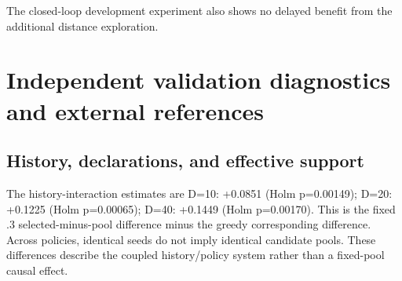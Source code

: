 \documentclass[suppldata]{interact}
\begin{document}
\endgroup

The closed-loop development experiment also shows no delayed benefit from the additional distance exploration.

\hypertarget{independent-validation-diagnostics-and-external-references}{%
\section{Independent validation diagnostics and external references}\label{independent-validation-diagnostics-and-external-references}}

\hypertarget{history-declarations-and-effective-support}{%
\subsection{History, declarations, and effective support}\label{history-declarations-and-effective-support}}

The history-interaction estimates are D=10: +0.0851 (Holm p=0.00149); D=20: +0.1225 (Holm p=0.00065); D=40: +0.1449 (Holm p=0.00170). This is the fixed .3 selected-minus-pool difference minus the greedy corresponding difference. Across policies, identical seeds do not imply identical candidate pools. These differences describe the coupled history/policy system rather than a fixed-pool causal effect.

\FloatBarrier\begingroup\fontsize{8.5}{10.5}\selectfont\setlength\tabcolsep{3pt}
\end{document}
